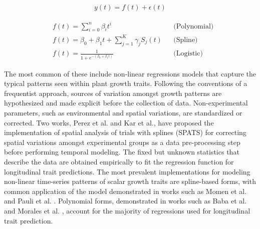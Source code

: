 \documentclass{article}
\begin{document}

\begin{align}\label{eqn:regress}
y(t) = f(t) + \epsilon(t)
\end{align}

\begin{align}\label{eqn:polynomial}
    &f(t) = \sum_{i=0}^{n} \beta_{i} t^{i}&& \text{(Polynomial)} \\ \label{eqn:spline}
    &f(t) = \beta_0 + \beta_1t  + \sum_{j=1}^{K} \gamma_j S_j(t) && \text{(Spline)} \\ \label{eqn:logit}
    &f(t) = \frac{1}{1 + e^{-(\beta_0 + \beta_1t)}} && \text{(Logistic)}
\end{align}

The most common of these include non-linear regressions models that capture the typical patterns seen within plant growth traits. Following the conventions of a frequentist approach, sources of variation amongst growth patterns are hypothesized and made explicit before the collection of data. Non-experimental parameters, such as environmental and spatial variations, are standardized or corrected. Two works, Perez et al. \cite{Perez-Valencia2022} and Kar et al.\cite{SpaTemHTP}, have proposed the implementation of spatial analysis of trials with splines (SPATS) for correcting spatial variations amongst experimental groups as a data pre-processing step before performing temporal modeling. The fixed but unknown statistics that describe the data are obtained empirically to fit the regression function for longitudinal trait predictions. The most prevalent implementations for modeling non-linear time-series patterns of scalar growth traits are spline-based forms, with common application of the model demonstrated in works such as Momen et al. \cite{Mehdi10.1534/g3.119.400346} and Pauli et al. \cite{Duke10.1534/g3.115.023515}. Polynomial forms, demonstrated in works such as Baba et al. \cite{Toshimi10.1371/journal.pone.0228118} and Morales et al. \cite{Morales10.1093/genetics/iyae037}, account for the majority of regressions used for longitudinal trait prediction.
\end{document}
